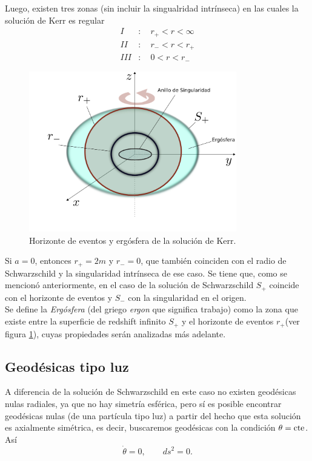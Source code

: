 Luego, existen tres zonas (sin incluir la singualridad intr\'inseca) en las cuales la soluci\'on de Kerr es regular
\begin{equation}
\begin{aligned}
I&:\quad r_+<r<\infty\\
II&:\quad r_{-}<r<r_{+}\\
III&:\quad 0<r<r_{-}
\end{aligned}
\end{equation}

\begin{figure}[H]
 \centering
\includegraphics[height=7cm,angle=0]{fig/fig-surface2.pdf}
\caption{Horizonte de eventos y erg\'osfera de la soluci\'on de Kerr.}
\label{fig:surface2}
\end{figure}

Si $a=0$, entonces $r_{+}=2m$ y $r_{-}=0$, que tambi\'en coinciden con el radio de Schwarzschild y la singularidad intr\'inseca de ese caso. Se tiene que, como se mencion\'o anteriormente, en el caso de la soluci\'on de Schwarzschild $S_{+}$ coincide con el horizonte de eventos y $S_{-}$ con la singularidad en el origen.\\

Se define la \textit{Erg\'osfera} (del griego \textit{ergon} que significa trabajo) como la zona que existe entre la superficie de redshift infinito $S_{+}$ y el horizonte de eventos $r_{+}$(ver figura \ref{fig:surface2}), cuyas propiedades ser\'an analizadas m\'as adelante.\\


\subsection{Geod\'esicas tipo luz}

A diferencia de la soluci\'on de Schwarzschild en este caso no existen geod\'esicas nulas radiales, ya que no hay simetr\'ia esf\'erica, pero s\'i es posible encontrar geod\'esicas nulas (de una part\'icula tipo luz) a partir del hecho que esta soluci\'on es axialmente sim\'etrica, es decir, buscaremos geod\'esicas con la condici\'on $\theta=\rm cte$. As\'i
\begin{equation}
\dot{\theta}=0,\qquad ds^2=0.
\end{equation}

